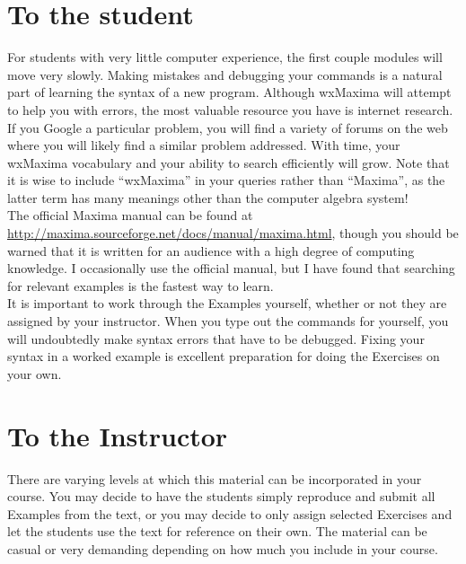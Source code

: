 \documentclass[10.5pt,twoside]{report}
\theoremstyle{definition}
\begin{document}
\pagebreak


\section*{\large{To the student}}

For students with very little computer experience, the first couple modules will move very slowly.  Making mistakes and debugging your commands is a natural part of learning the syntax of a new program.  Although wxMaxima will attempt to help you with errors, the most valuable resource you have is internet research.  If you Google a particular problem, you will find a variety of forums on the web where you will likely find a similar problem addressed.  With time, your wxMaxima vocabulary and your ability to search efficiently will grow.  Note that it is wise to include ``wxMaxima'' in your queries rather than ``Maxima'', as the latter term has many meanings other than the computer algebra system! \\

The official Maxima manual can be found at \url{http://maxima.sourceforge.net/docs/manual/maxima.html}, though you 
should be warned that it is written for an audience with a high degree
of computing knowledge.  I occasionally use the official manual, but I have found that searching for relevant examples is the fastest way to learn.\\

It is important to work through the Examples yourself, whether or not they are assigned by your instructor.  When you type out the commands for yourself, you will undoubtedly make syntax errors that have to be debugged.  Fixing your syntax in a worked example is excellent preparation for doing the Exercises on your own.\\


\section*{\large{To the Instructor}}

There are varying levels at which this material can be incorporated in your course.  You may decide to have the students simply reproduce and submit all Examples from the text, or you may decide to only assign selected Exercises and let the students use the text for reference on their own.  The material can be casual or very demanding depending on how much you include in your course. \\
\end{document}
